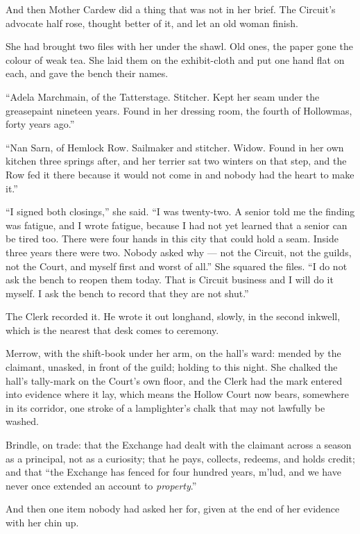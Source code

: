 And then Mother Cardew did a thing that was not in her brief. The Circuit's advocate half rose, thought better of it, and let an old woman finish.

She had brought two files with her under the shawl. Old ones, the paper gone the colour of weak tea. She laid them on the exhibit-cloth and put one hand flat on each, and gave the bench their names.

``Adela Marchmain, of the Tatterstage. Stitcher. Kept her seam under the greasepaint nineteen years. Found in her dressing room, the fourth of Hollowmas, forty years ago.''

``Nan Sarn, of Hemlock Row. Sailmaker and stitcher. Widow. Found in her own kitchen three springs after, and her terrier sat two winters on that step, and the Row fed it there because it would not come in and nobody had the heart to make it.''

``I signed both closings,'' she said. ``I was twenty-two. A senior told me the finding was fatigue, and I wrote fatigue, because I had not yet learned that a senior can be tired too. There were four hands in this city that could hold a seam. Inside three years there were two. Nobody asked why --- not the Circuit, not the guilds, not the Court, and myself first and worst of all.'' She squared the files. ``I do not ask the bench to reopen them today. That is Circuit business and I will do it myself. I ask the bench to record that they are not shut.''

The Clerk recorded it. He wrote it out longhand, slowly, in the second inkwell, which is the nearest that desk comes to ceremony.

Merrow, with the shift-book under her arm, on the hall's ward: mended by the claimant, unasked, in front of the guild; holding to this night. She chalked the hall's tally-mark on the Court's own floor, and the Clerk had the mark entered into evidence where it lay, which means the Hollow Court now bears, somewhere in its corridor, one stroke of a lamplighter's chalk that may not lawfully be washed.

Brindle, on trade: that the Exchange had dealt with the claimant across a season as a principal, not as a curiosity; that he pays, collects, redeems, and holds credit; and that ``the Exchange has fenced for four hundred years, m'lud, and we have never once extended an account to \emph{property}.''

And then one item nobody had asked her for, given at the end of her evidence with her chin up.

